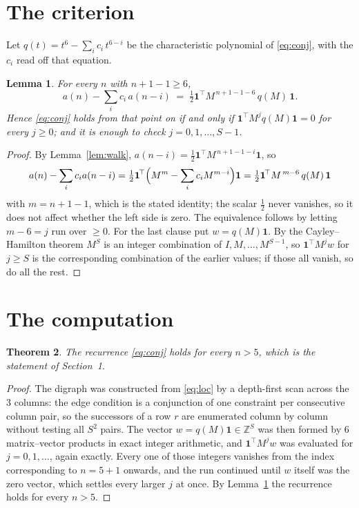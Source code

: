 \documentclass[11pt,a4paper]{article}
\theoremstyle{plain}
\newtheorem{theorem}{Theorem}
\newtheorem{lemma}[theorem]{Lemma}
\theoremstyle{definition}
\begin{document}
\section{The criterion}

Let $q(t)=t^{6}-\sum_i c_i\,t^{6-i}$ be the characteristic polynomial of
\eqref{eq:conj}, with the $c_i$ read off that equation.

\begin{lemma}\label{lem:crit}
For every $n$ with $n+1-1\ge6$,
\[
a(n)-\sum_i c_i\,a(n-i)\;=\;\tfrac1{2}\mathbf{1}^{\!\top}M^{\,n+1-1-6}\,q(M)\,\mathbf{1} .
\]
Hence \eqref{eq:conj} holds from that point on if and only if
$\mathbf{1}^{\!\top}M^{j}q(M)\mathbf{1}=0$ for every $j\ge0$; and it is enough to check
$j=0,1,\dots,S-1$.
\end{lemma}

\begin{proof}
By Lemma~\ref{lem:walk}, $a(n-i)=\tfrac1{2}\mathbf{1}^{\!\top}M^{\,n+1-1-i}\mathbf{1}$, so
\[
a(n)-\sum_i c_i a(n-i)
=\tfrac1{2}\mathbf{1}^{\!\top}\Bigl(M^{m}-\sum_i c_i M^{m-i}\Bigr)\mathbf{1}
=\tfrac1{2}\mathbf{1}^{\!\top}M^{\,m-6}\,q(M)\,\mathbf{1}
\]
with $m=n+1-1$, which is the stated identity; the scalar $\tfrac1{2}$ never vanishes, so
it does not affect whether the left side is zero. The equivalence follows by letting
$m-6=j$ run over $\ge0$. For the last clause put $w=q(M)\mathbf{1}$. By the
Cayley--Hamilton theorem $M^{S}$ is an integer combination of $I,M,\dots,M^{S-1}$, so
$\mathbf{1}^{\!\top}M^{j}w$ for $j\ge S$ is the corresponding combination of the earlier
values; if those all vanish, so do all the rest.
\end{proof}

\section{The computation}

\begin{theorem}
The recurrence \eqref{eq:conj} holds for every $n>5$, which is the statement of
Section~1.
\end{theorem}

\begin{proof}
The digraph was constructed from \eqref{eq:loc} by a depth-first scan across the $3$
columns: the edge condition is a conjunction of one constraint per consecutive column
pair, so the successors of a row $r$ are enumerated column by column without testing all
$S^2$ pairs. The vector $w=q(M)\mathbf{1}\in\mathbb{Z}^{S}$ was then formed by $6$
matrix--vector products in exact integer arithmetic, and $\mathbf{1}^{\!\top}M^{j}w$ was
evaluated for $j=0,1,\dots$, again exactly. Every one of those integers vanishes from the
index corresponding to $n=5+1$ onwards, and the run continued until $w$ itself was the
zero vector, which settles every larger $j$ at once. By Lemma~\ref{lem:crit} the recurrence
holds for every $n>5$.
\end{proof}
\end{document}
